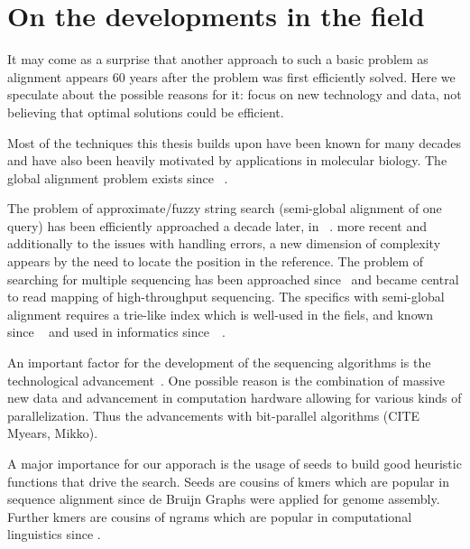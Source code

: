 \section{On the developments in the field}

It may come as a surprise that another approach to such a basic problem as
alignment appears 60 years after the problem was first efficiently solved. Here
we speculate about the possible reasons for it: focus on new technology and
data, not believing that optimal solutions could be efficient.


Most of the techniques this thesis builds upon have been known for many decades
and have also been heavily motivated by applications in molecular biology. The
global alignment problem exists since
\citeyear{vintsyuk1968speech}~\cite{vintsyuk1968speech,needleman1970general}.

The problem of approximate/fuzzy string search (semi-global alignment of one
query) has been efficiently approached a decade later, in
\citeyear{sellers1980theory}~\cite{sellers1980theory,smith1981identification}.
more recent and additionally to the issues with handling errors, a new dimension
of complexity appears by the need to locate the position in the reference. The
problem of searching for multiple sequencing has been approached
since\citeyear{pearson1988improved}~\cite{pearson1988improved} and became
central to read mapping of high-throughput sequencing. The specifics with
semi-global alignment requires a trie-like index which is well-used in the
fiels, and known since
\citeyear{thue1912gegenseitige}~\cite{thue1912gegenseitige} and used in
informatics since~\citeyear{de1959file}~\cite{de1959file}.

An important factor for the development of the sequencing algorithms is the
technological advancement~\cite{alser2021technology}. One possible reason is the
combination of massive new data and advancement in computation hardware allowing
for various kinds of parallelization. Thus the advancements with bit-parallel
algorithms (CITE Myears, Mikko).

A major importance for our apporach is the usage of seeds to build good
heuristic functions that drive the \A search. Seeds are cousins of kmers which
are popular in sequence alignment since de Bruijn Graphs were applied for genome
assembly. Further kmers are cousins of ngrams which are popular in computational
linguistics since .

